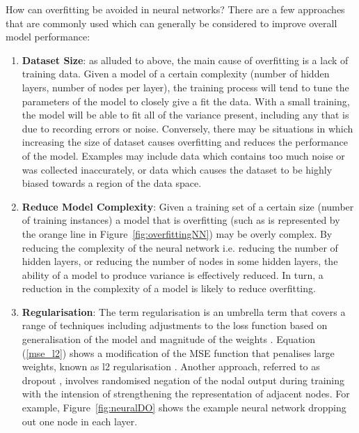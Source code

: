 How can overfitting be avoided in neural networks? There are a few approaches that are commonly used \cite{brownlee2018avoid} which can generally be considered to improve overall model performance:

\begin{enumerate}
	
	\item \label{bp_dataset_size} \textbf{Dataset Size}: as alluded to above, the main cause of overfitting is a lack of training data. Given a model of a certain complexity (number of hidden layers, number of nodes per layer), the training process will tend to tune the parameters of the model to closely give a fit the data. With a small training, the model will be able to fit all of the variance present, including any that is due to recording errors or noise. Conversely, there may be situations in which increasing the size of dataset causes overfitting and reduces the performance of the model. Examples may include data which contains too much noise or was collected inaccurately, or data which causes the dataset to be highly biased towards a region of the data space.   
	
	\item \textbf{Reduce Model Complexity}: Given a training set of a certain size (number of training instances) a model that is overfitting (such as is represented by the orange line in Figure~\ref{fig:overfittingNN}) may be overly complex. By reducing the complexity of the neural network i.e. reducing the number of hidden layers, or reducing the number of nodes in some hidden layers, the ability of a model to produce variance is effectively reduced. In turn, a reduction in the complexity of a model is likely to reduce overfitting.
	
	\item \textbf{Regularisation}: The term regularisation is an umbrella term that covers a range of techniques including adjustments to the loss function based on generalisation of the model and magnitude of the weights \cite{mc2001improving}. Equation (\ref{mse_l2}) shows a modification of the MSE function that penalises large weights, known as l2 regularisation \cite{van2017l2}. Another approach, referred to as dropout \cite{srivastava2014dropout}, involves randomised negation of the nodal output during training with the intension of strengthening the representation of adjacent nodes. For example, Figure~\ref{fig:neuralDO} shows the example neural network dropping out one node in each layer.
	

\end{enumerate}
